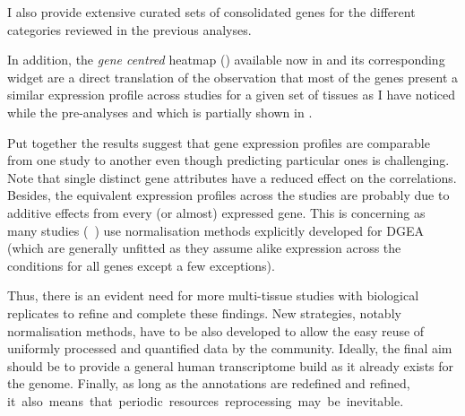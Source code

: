 I also provide extensive curated sets of consolidated genes
for the different categories reviewed in the previous analyses.

In addition,
the \emph{gene centred} heatmap () available now
in  and its corresponding widget
are a direct translation of the observation
that most of the genes present a similar expression profile across studies
for a given set of tissues
as I have noticed while the pre-analyses
and which is partially shown in .\\
\vspace{-\baselineskip}

Put together the results suggest that
gene expression profiles are comparable from one study to another even though
predicting particular ones is challenging.
Note that single distinct gene attributes have a reduced effect on the correlations.
Besides, the equivalent expression profiles across the studies
are probably due to additive effects from every (or almost) expressed gene.
This is concerning as many studies (\eg{}~\cite{Sudmant2015-zt})
use normalisation methods explicitly developed for \gls{DGEA}  %
(which are generally unfitted as
they assume alike expression across the conditions for all genes
except a few exceptions).\\
\vspace{-\baselineskip}

Thus, there is an evident need for more multi-tissue studies
with biological replicates to refine and complete these findings.
New strategies, notably normalisation methods, have to be also developed
to allow the easy reuse of uniformly processed and quantified data by
the community.
Ideally, the final aim should be to provide a general human transcriptome build
as it already exists for the genome.
Finally, as long as the annotations are redefined and refined,
it~also~means~that~periodic~resources~reprocessing~may~be~inevitable.




